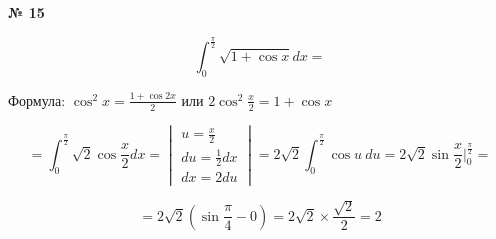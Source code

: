 \documentclass{article}
\begin{document}
\textbf{№ 15} 
\Large

$$ \int_{0}^{\frac{\pi}{2}} \sqrt{1+\cos{x}}dx = $$

Формула: $ \cos^2x = \frac{1+\cos{2x}}{2}$ или $2\cos^2{\frac{x}{2}} = 1+\cos{x}$

$$ = \int_{0}^{\frac{\pi}{2}} \sqrt{2} \cos{\frac{x}{2}}dx
= \begin{vmatrix}   u  = \frac{x}{2} \\ 
                    du = \frac{1}{2} dx \\
                    dx = 2du \end{vmatrix}
= 2\sqrt{2} \int_{0}^{\frac{\pi}{2}}\cos{u} \ du 
= 2\sqrt{2} \sin{\frac{x}{2}} \bigg\vert_{0}^{\frac{\pi}{2}}
= $$

$$ = 2\sqrt{2} \left( \sin{\frac{\pi}{4}} - 0 \right)
= 2\sqrt{2} \times \frac{\sqrt{2}}{2}
= 2$$
\end{document}
